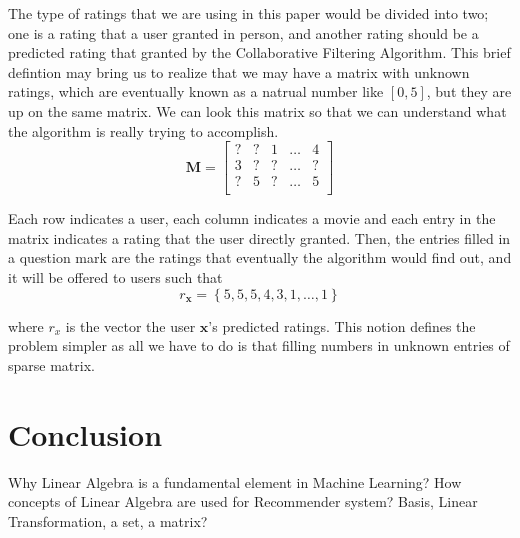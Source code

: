 \documentclass[paper=a4, fontsize=12pt]{scrartcl} %
\numberwithin{equation}{section} %
\numberwithin{figure}{section} %
\numberwithin{table}{section} %
\newcommand{\matxxx}[3] {
\begin{bmatrix}
  #1 \\
  #2 \\
  #3 \\
\end{bmatrix}
}
\begin{document}
  The type of ratings that we are using in this paper would be divided into two;
  one is a rating that a user granted in person, and another rating should be a
  predicted rating that granted by the Collaborative Filtering Algorithm. This
  brief defintion may bring us to realize that we may have a matrix with unknown
  ratings, which are eventually known as a natrual number like \([0,5]\), but
  they are up on the same matrix. We can look this matrix so that we can
  understand what the algorithm is really trying to accomplish. \\

	\[
		\mathbf{M} =
		\matxxx
		{? & ? & 1 & \dots & 4}
		{3 & ? & ? & \dots & ?}
		{? & 5 & ? & \dots & 5}
	\]

  Each row indicates a user, each column indicates a movie and each entry in the
  matrix indicates a rating that the user directly granted. Then, the entries
  filled in a question mark are the ratings that eventually the algorithm would
  find out, and it will be offered to users such that
  \[
    r_{\mathbf{x}} = \left\{5,5,5,4,3,1,\dots,1\right\}
  \]

  where \(r_x\) is the vector the user \(\mathbf{x}\)'s predicted ratings. This
  notion defines the problem simpler as all we have to do is that filling
  numbers in unknown entries of sparse matrix.


  \section{Conclusion}

  Why Linear Algebra is a fundamental element in Machine Learning? How concepts of
  Linear Algebra are used for Recommender system?
  Basis, Linear Transformation, a set, a matrix?

\end{document}
